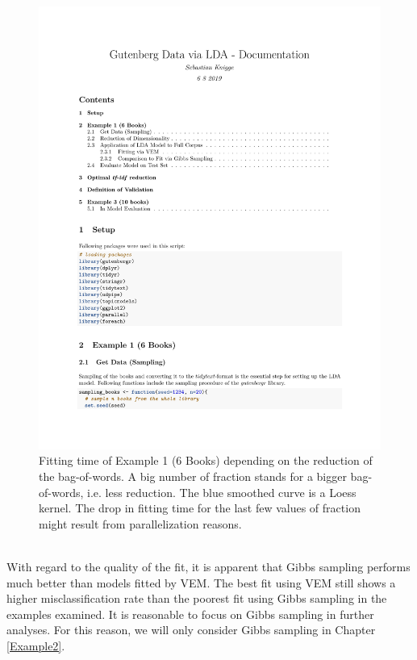 \documentclass[11pt,a4paper]{article}
\begin{document}
\begin{figure}[h]
	\centering
	\includegraphics[page=15, trim=70 400 0 0,clip,width=1.1\textwidth]{LDA_Documentation.pdf}
	\caption{Fitting time of Example 1 (6 Books) depending on the reduction of the bag-of-words. A big number of fraction stands for a bigger bag-of-words, i.e. less reduction. The blue smoothed curve is a Loess kernel. The drop in fitting time for the last few values of fraction might result from parallelization reasons.}
	\label{fitting_time_tfidf}
\end{figure}
\ \\
With regard to the quality of the fit, it is apparent that Gibbs sampling performs much better than models fitted by VEM. The best fit using VEM still shows a higher misclassification rate than the poorest fit using Gibbs sampling in the examples examined. It is reasonable to focus on Gibbs sampling in further analyses. For this reason, we will only consider Gibbs sampling in Chapter \ref{Example2}.\\
\end{document}
